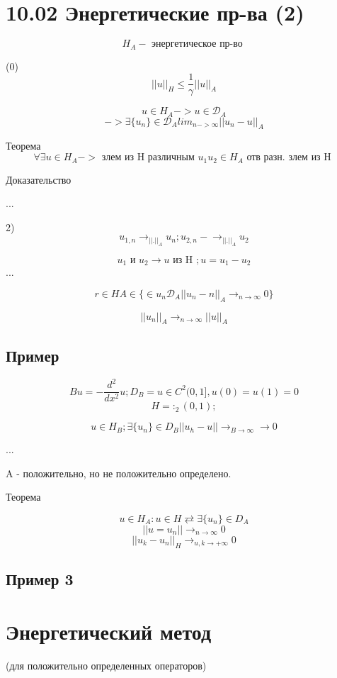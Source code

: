 \documentclass{article}
\begin{document}
\section{10.02 Энергетические пр-ва (2)}

\[ H_A -\textrm{ энергетическое пр-во } \]

(0) \[ {||u||}_H \leq \frac{1}{\gamma   } {||u||}_A \]

\[ u \in H_A -> u \in \mathcal{D}_A \]
\[ -> \exists \{ u_n \} \in \mathcal{D}_A  {lim}_{n-> \infty} || u_n-u||_A \]

Теорема 
\[ \forall \exists u \in H_A -> \textrm{  злем из H различным } u_1 u_2 \in H_A \textrm{ отв разн. злем из H }\]

Доказательство 

...

2) \[  u_{1, n} \rightarrow_{||.||_A} u_n; u_{2,n} -\rightarrow_{||.||_A} u_2\]

\[ u_1 \textrm{ и  } u_2 \rightarrow u \textrm{ из H }; u = u_1 - u_2\]
...

\[  r \in H A \in \{ \in u_n \mathcal{D}_A ||u_n -n ||_A \rightarrow_{n \rightarrow \infty} 0 \} \]

\[ || u_n ||_A \rightarrow_{n \rightarrow \infty} ||u||_A \]



\subsection{Пример}

\[ Bu = - \frac{d^2}{d x^2} u ; D_{B} = {u \in C^2 (0,1]}, u(0) = u(1) = 0 \]
\[ H = :_2 (0, 1); \]

\[ u \in H_B; \exists \{ u_n \} \in D_B || u_h - u || \rightarrow_{B \rightarrow \infty} \rightarrow 0\]

...

A - положительно, но не положительно определено.

Теорема

\[ u \in H_A : u \in H \rightleftarrows \exists \{ u_n \} \in D_A \]
\[ || u = u_n || \rightarrow_{n \rightarrow \infty} 0 \]
\[ || u_k - u_n ||_H \rightarrow_{u,k \rightarrow + \infty} 0 \]

\subsection{Пример 3}

\section{Энергетический метод}
(для положительно определенных операторов)
\end{document}
